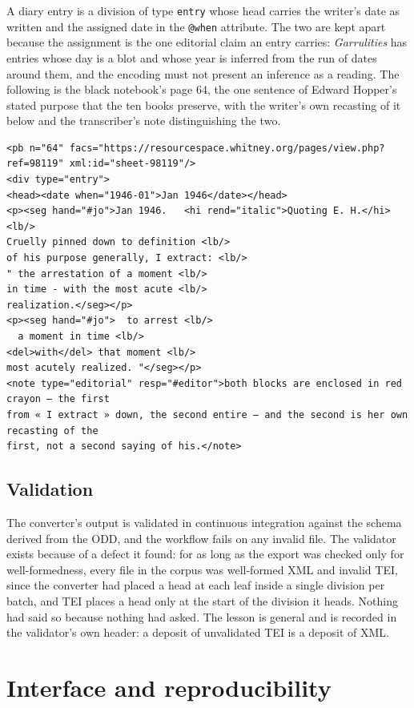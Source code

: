 \documentclass[11pt]{article}
\begin{document}
A diary entry is a division of type \texttt{entry} whose head carries the writer's date as written and the assigned date in the \texttt{@when} attribute. The two are kept apart because the assignment is the one editorial claim an entry carries: \emph{Garrulities} has entries whose day is a blot and whose year is inferred from the run of dates around them, and the encoding must not present an inference as a reading. The following is the black notebook's page 64, the one sentence of Edward Hopper's stated purpose that the ten books preserve, with the writer's own recasting of it below and the transcriber's note distinguishing the two.

\begin{lstlisting}
<pb n="64" facs="https://resourcespace.whitney.org/pages/view.php?ref=98119" xml:id="sheet-98119"/>
<div type="entry">
<head><date when="1946-01">Jan 1946</date></head>
<p><seg hand="#jo">Jan 1946.   <hi rend="italic">Quoting E. H.</hi> <lb/>
Cruelly pinned down to definition <lb/>
of his purpose generally, I extract: <lb/>
" the arrestation of a moment <lb/>
in time - with the most acute <lb/>
realization.</seg></p>
<p><seg hand="#jo">  to arrest <lb/>
  a moment in time <lb/>
<del>with</del> that moment <lb/>
most acutely realized. "</seg></p>
<note type="editorial" resp="#editor">both blocks are enclosed in red crayon — the first
from « I extract » down, the second entire — and the second is her own recasting of the
first, not a second saying of his.</note>
\end{lstlisting}

\subsection{Validation}

The converter's output is validated in continuous integration against the schema derived from the ODD, and the workflow fails on any invalid file. The validator exists because of a defect it found: for as long as the export was checked only for well-formedness, every file in the corpus was well-formed XML and invalid TEI, since the converter had placed a head at each leaf inside a single division per batch, and TEI places a head only at the start of the division it heads. Nothing had said so because nothing had asked. The lesson is general and is recorded in the validator's own header: a deposit of unvalidated TEI is a deposit of XML.

\section{Interface and reproducibility}
\end{document}
